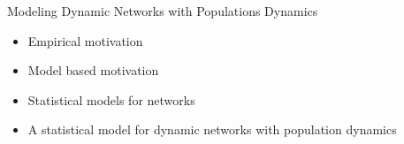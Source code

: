 \documentclass[10pt]{beamer}
\begin{document}
\begin{frame}{} 

\begin{block}{Modeling Dynamic Networks with Populations Dynamics}
\begin{itemize}
\item Empirical motivation
\item Model based motivation
\item Statistical models for networks
\item A statistical model for dynamic networks with population dynamics  
\end{itemize}
\end{block}

\end{frame}
\end{document}
